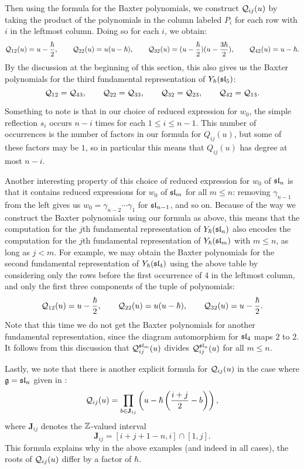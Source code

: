 Then using the formula for the Baxter polynomials, we construct $\mathcal{Q}_{ij}(u)$ by taking the product of the polynomials in the column labeled $P_i$ for each row with $i$ in the leftmost column.
Doing so for each $i$, we obtain:
\[\mathcal{Q}_{12}(u) = u-\frac{\hbar}{2}, \qquad
\mathcal{Q}_{22}(u) = u(u-\hbar), \qquad
\mathcal{Q}_{32}(u) = (u-\frac{\hbar}{2})(u-\frac{3\hbar}{2}), \qquad
\mathcal{Q}_{42}(u) = u-\hbar.\]
By the discussion at the beginning of this section, this also gives us the Baxter polynomials for the third fundamental representation of $Y_\hbar(\mathfrak{sl}_5)$:
\[\mathcal{Q}_{12} = \mathcal{Q}_{43}, \qquad
\mathcal{Q}_{22} = \mathcal{Q}_{33}, \qquad
\mathcal{Q}_{32} = \mathcal{Q}_{23}, \qquad
\mathcal{Q}_{42} = \mathcal{Q}_{13}.\]

Something to note is that in our choice of reduced expression for $w_0$, the simple reflection $s_i$ occurs $n-i$ times for each $1\leq i\leq n-1$.
This number of occurrences is the number of factors in our formula for $Q_{ij}(u)$, but some of these factors may be $1$, so in particular this means that $Q_{ij}(u)$ has degree at most $n-i$.

Another interesting property of this choice of reduced expression for $w_0$ of $\mathfrak{sl}_n$ is that it contains reduced expressions for $w_0$ of $\mathfrak{sl}_m$ for all $m\leq n$: removing $\gamma_{n-1}$ from the left gives us $w_0=\gamma_{n-2}\cdots\gamma_1$ for $\mathfrak{sl}_{n-1}$, and so on.
Because of the way we construct the Baxter polynomials using our formula as above, this means that the computation for the $j$th fundamental representation of $Y_\hbar(\mathfrak{sl}_n)$ also encodes the computation for the $j$th fundamental representation of $Y_\hbar(\mathfrak{sl}_m)$ with $m\leq n$, as long as $j<m$.
For example, we may obtain the Baxter polynomials for the second fundamental representation of $Y_\hbar(\mathfrak{sl}_4)$ using the above table by considering only the rows before the first occurrence of $4$ in the leftmost column, and only the first three components of the tuple of polynomials:
\[\mathcal{Q}_{12}(u) = u-\frac{\hbar}{2}, \qquad
\mathcal{Q}_{22}(u) = u(u-\hbar), \qquad
\mathcal{Q}_{32}(u) = u-\frac{\hbar}{2}.\]
Note that this time we do not get the Baxter polynomials for another fundamental representation, since the diagram automorphism for $\mathfrak{sl}_4$ maps $2$ to $2$.
It follows from this discussion that  $\mathcal{Q}_{ij}^{\mathfrak{sl}_m}(u)$ divides $\mathcal{Q}_{ij}^{\mathfrak{sl}_n}(u)$ for all $m\leq n$.

Lastly, we note that there is another explicit formula for $\mathcal{Q}_{ij}(u)$ in the case where $\mathfrak{g}=\mathfrak{sl}_n$ given in \cite[Cor. 5.5]{gautam_poles_2023}:
\[\mathcal{Q}_{ij}(u) = \prod_{b\in\mathbf{J}_{ij}}\left(u-\hbar\left(\frac{i+j}{2}-b\right)\right),\]
where $\mathbf{J}_{ij}$ denotes the $\mathbb{Z}$-valued interval
\[\mathbf{J}_{ij} = [i+j+1-n, i] \cap [1, j].\]
This formula explains why in the above examples (and indeed in all cases), the roots of $\mathcal{Q}_{ij}(u)$ differ by a factor of $\hbar$.
